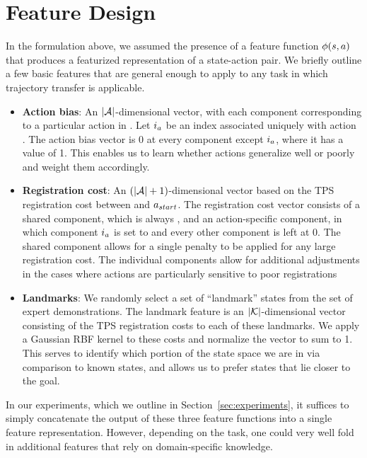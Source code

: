 \section{Feature Design}
\label{sec:features}

In the formulation above, we assumed the presence of a feature function
$\phi(s, a)$ that produces a featurized representation of
a state-action pair.  We briefly outline a few basic features that are general
enough to apply to any task in which trajectory transfer is
applicable. 

\begin{itemize}
  \item \textbf{Action bias}: An $|\mathcal{A}{}|$-dimensional vector, with each
    component corresponding to a particular action in \actionset{}. Let
    $i{}_{a{}}$ be an index associated uniquely with action
    \actionvar{}. The action bias vector is 0 at every component except
    $i{}_{a{}}$, where it has a value of 1. This enables us to
    learn whether actions generalize well or poorly and weight them accordingly.
  \item \textbf{Registration cost}: An $(|\mathcal{A}{}|+1)$-dimensional vector
    based on the TPS registration cost \regcost{} between \statevar{} and
    $a{}_{start}$. The registration cost vector consists of a shared
    component, which is always \regcost{}, and an action-specific component, in
    which component $i{}_{a{}}$ is set to \regcost{} and every
    other component is left at 0. The shared component allows for a single
    penalty to be applied for any large registration cost. The individual
    components allow for additional adjustments in the cases where actions are
    particularly sensitive to poor registrations
  \item \textbf{Landmarks}: We randomly select a set of ``landmark'' states
    \landmarkset{} from the set of expert demonstrations. The landmark feature
    is an $|\mathcal{K}{}|$-dimensional vector consisting of the TPS
    registration costs to each of these landmarks. We apply a Gaussian RBF
    kernel to these costs and normalize the vector to sum to 1. This serves to
    identify which portion of the state space we are in via comparison to known
    states, and allows us to prefer states that lie closer to the goal.
\end{itemize}

In our experiments, which we outline in Section~\ref{sec:experiments}, it
suffices to simply concatenate the output of these three feature functions into
a single feature representation. However, depending on the task, one could
very well fold in additional features that rely on domain-specific knowledge.
